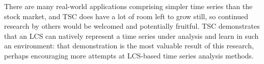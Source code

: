 There are many real-world applications comprising simpler time series than the stock market, and TSC does have a lot of room left to grow still, so continued research by others would be welcomed and potentially fruitful.
TSC demonstrates that an LCS can natively represent a time series under analysis and learn in such an environment:
that demonstration is the most valuable result of this research, perhaps encouraging more attempts at LCS-based time series analysis methods.
